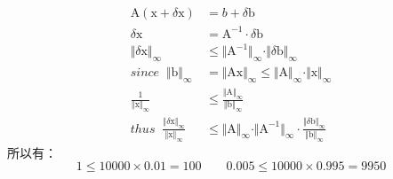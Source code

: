 \documentclass[12pt, onecolumn]{article}
\newcommand\bsm[1]{\boldsymbol{\mathrm{#1}}}
\begin{document}
	\begin{equation}
	\begin{aligned}
	\bsm{A}(\bsm{x}+\delta \bsm{x})&=b+\delta \bsm{b}
	\\
	\delta \bsm{x}&=\bsm{A}^{-1}\cdot\delta\bsm{b}
	\\
	\Vert\delta\bsm{x}\Vert_{\infty}&\le\Vert\bsm{A}^{-1}\Vert_{\infty}\cdot\Vert\delta\bsm{b}\Vert_{\infty}
	\\
	since\;\;\Vert\bsm{b}\Vert_{\infty}&=\Vert\bsm{Ax}\Vert_{\infty}\le\Vert\bsm{A}\Vert_{\infty}\cdot\Vert\bsm{x}\Vert_{\infty}
	\\
	\frac{1}{\Vert\bsm{x}\Vert_{\infty}}&\le\frac{\Vert\bsm{A}\Vert_{\infty}}{\Vert\bsm{b}\Vert_{\infty}}
	\\
	thus\;\;
	\frac{\Vert\delta\bsm{x}\Vert_{\infty}}{\Vert\bsm{x}\Vert_{\infty}}&\le
	\Vert\bsm{A}\Vert_{\infty}\cdot\Vert\bsm{A}^{-1}\Vert_{\infty}\cdot\frac{\Vert\delta\bsm{b}\Vert_{\infty}}{\Vert\bsm{b}\Vert_{\infty}}
	\end{aligned}
	\end{equation}
	所以有：
	\begin{equation}
	1\le 10000\times 0.01=100
	\qquad
	0.005\le 10000\times 0.995=9950
	\end{equation}
	
\end{document}
